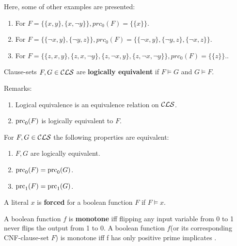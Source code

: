 \documentclass[12pt]{book}
\begin{document}
\begin{examp}\label{exp:bbb}
      Here, some of other examples are presented:
	  \begin{enumerate}
	        \item For $F = \{\{x, y\} , \{x,\neg y\}\}, prc_0(F) = \{\{x\}\}$.
			\item For $F = \{\{ \neg x, y\} , \{ \neg y, z\}\}, prc_0(F) = \{\{\neg x, y\} , \{\neg y, z\} , \{\neg x, z\}\}$.
			\item For $F = \{\{z, x, y\} , \{z, x, \neg y\} , \{z, \neg x, y\} , \{z,\neg x, \neg y\}\}, prc_0(F) = \{\{z\}\}.$.
      \end{enumerate}
\end{examp}

\begin{defi}\label{def:logequiv}
  Clause-sets $F, G \in \mathcal{CLS}$ are \textbf{logically equivalent} if $F \models G$ and $G \models F$.
\end{defi}
Remarks:
\begin{enumerate}
\item Logical equivalence is an equivalence relation on $\mathcal{CLS}$.
\item $\operatorname{prc}_0(F)$ is logically equivalent to $F$.
\end{enumerate}

\begin{lem}\label{lem:logequiv}
  For $F, G \in \mathcal{CLS}$ the following properties are equivalent:
  \begin{enumerate}
  \item $F, G$ are logically equivalent.
  \item $\operatorname{prc}_0(F) = \operatorname{prc}_0(G)$.
  \item $\operatorname{prc}_1(F) = \operatorname{prc}_1(G)$.
  \end{enumerate}
\end{lem}

\begin{defi}\label{def:forced1}
      A literal $x$ is \textbf{forced} for a boolean function $F$ if $F \models x$.
\end{defi}
\begin{defi}\label{def:imp3}
      A boolean function $f$ is \textbf{monotone} iff flipping any input variable from 0 to 1 never flips the output from 1 to 0.
	  A boolean function $f$(or its corresponding CNF-clause-set $F$) is monotone iff f has only positive prime implicates \cite{h8}.
\end{defi}
\end{document}
